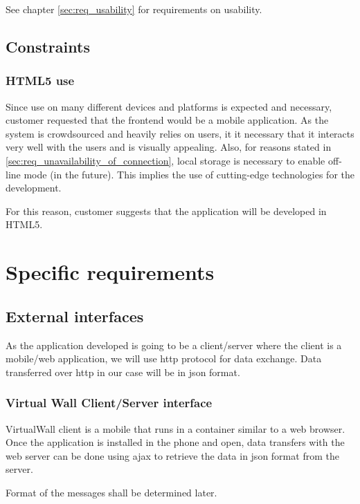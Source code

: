\documentclass[11pt]{book}
\begin{document}
See chapter \ref{sec:req_usability} for requirements on usability.

\subsection{Constraints}

\subsubsection{HTML5 use}
Since use on many different devices and platforms is expected and necessary, customer requested that the frontend would be a mobile application. As the system is crowdsourced and heavily relies on users, it it necessary that it interacts very well with the users and is visually appealing. Also, for reasons stated in \ref{sec:req_unavailability_of_connection}, local storage is necessary to enable off-line mode (in the future). This implies the use of cutting-edge technologies for the development.

For this reason, customer suggests that the application will be developed in HTML5.

\section{Specific requirements}\label{sec:req_specific_requirements}

\subsection{External interfaces}
As the application developed is going to be a client/server where the client is a mobile/web application, we will use \gls{http} protocol for data exchange. Data transferred over \gls{http} in our case will be in \gls{json} format.

\subsubsection{Virtual Wall Client/Server interface}
VirtualWall client is a mobile that runs in a container similar to a web browser. Once the application is installed in the phone and open, data transfers with the web server can be done using \gls{ajax} to retrieve the data in \gls{json} format from the server.

Format of the messages shall be determined later. %
\end{document}
